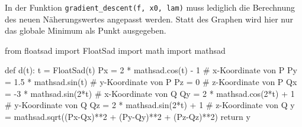 \documentclass[
  a4paper,
  DIV=11]{scrreprt}
\newenvironment{Shaded}{\begin{snugshade}}{\end{snugshade}}
\newcommand{\CommentTok}[1]{\textcolor[rgb]{0.37,0.37,0.37}{#1}}
\newcommand{\ControlFlowTok}[1]{\textcolor[rgb]{0.00,0.23,0.31}{#1}}
\newcommand{\DecValTok}[1]{\textcolor[rgb]{0.68,0.00,0.00}{#1}}
\newcommand{\FloatTok}[1]{\textcolor[rgb]{0.68,0.00,0.00}{#1}}
\newcommand{\ImportTok}[1]{\textcolor[rgb]{0.00,0.46,0.62}{#1}}
\newcommand{\KeywordTok}[1]{\textcolor[rgb]{0.00,0.23,0.31}{#1}}
\newcommand{\NormalTok}[1]{\textcolor[rgb]{0.00,0.23,0.31}{#1}}
\newcommand{\OperatorTok}[1]{\textcolor[rgb]{0.37,0.37,0.37}{#1}}
\theoremstyle{definition}
\theoremstyle{definition}
\theoremstyle{remark}
\begin{document}
\begin{tcolorbox}[enhanced jigsaw, titlerule=0mm, title=\textcolor{quarto-callout-tip-color}{\faLightbulb}\hspace{0.5em}{Lösung}, breakable, coltitle=black, leftrule=.75mm, bottomrule=.15mm, colback=white, rightrule=.15mm, opacitybacktitle=0.6, bottomtitle=1mm, toptitle=1mm, left=2mm, toprule=.15mm, colbacktitle=quarto-callout-tip-color!10!white, colframe=quarto-callout-tip-color-frame, arc=.35mm, opacityback=0]

In der Funktion \texttt{gradient\_descent(f,\ x0,\ lam)} muss lediglich
die Berechnung des neuen Näherungswertes angepasst werden. Statt des
Graphen wird hier nur das globale Minimum als Punkt ausgegeben.

\begin{Shaded}
\begin{Highlighting}[]
\ImportTok{from}\NormalTok{ floatsad }\ImportTok{import}\NormalTok{ FloatSad}
\ImportTok{import}\NormalTok{ math}
\ImportTok{import}\NormalTok{ mathsad}

\KeywordTok{def}\NormalTok{ d(t):}
\NormalTok{    t }\OperatorTok{=}\NormalTok{ FloatSad(t)}
\NormalTok{    Px }\OperatorTok{=} \DecValTok{2} \OperatorTok{*}\NormalTok{ mathsad.cos(t) }\OperatorTok{{-}} \DecValTok{1}    \CommentTok{\# x{-}Koordinate von P}
\NormalTok{    Py }\OperatorTok{=} \FloatTok{1.5} \OperatorTok{*}\NormalTok{ mathsad.sin(t)      }\CommentTok{\# y{-}Koordinate von P}
\NormalTok{    Pz }\OperatorTok{=} \DecValTok{0}                         \CommentTok{\# z{-}Koordinate von P}
\NormalTok{    Qx }\OperatorTok{=} \OperatorTok{{-}}\DecValTok{3} \OperatorTok{*}\NormalTok{ mathsad.sin(}\DecValTok{2}\OperatorTok{*}\NormalTok{t)     }\CommentTok{\# x{-}Koordinate von Q}
\NormalTok{    Qy }\OperatorTok{=} \DecValTok{2} \OperatorTok{*}\NormalTok{ mathsad.cos(}\DecValTok{2}\OperatorTok{*}\NormalTok{t) }\OperatorTok{+} \DecValTok{1}  \CommentTok{\# y{-}Koordinate von Q}
\NormalTok{    Qz }\OperatorTok{=} \DecValTok{2} \OperatorTok{*}\NormalTok{ mathsad.sin(}\DecValTok{2}\OperatorTok{*}\NormalTok{t) }\OperatorTok{+} \DecValTok{1}  \CommentTok{\# z{-}Koordinate von Q}
\NormalTok{    y }\OperatorTok{=}\NormalTok{ mathsad.sqrt((Px}\OperatorTok{{-}}\NormalTok{Qx)}\OperatorTok{**}\DecValTok{2} \OperatorTok{+}\NormalTok{ (Py}\OperatorTok{{-}}\NormalTok{Qy)}\OperatorTok{**}\DecValTok{2} \OperatorTok{+}\NormalTok{ (Pz}\OperatorTok{{-}}\NormalTok{Qz)}\OperatorTok{**}\DecValTok{2}\NormalTok{)}
    \ControlFlowTok{return}\NormalTok{ y}


\end{Highlighting}
\end{Shaded}
\end{tcolorbox}
\end{document}
